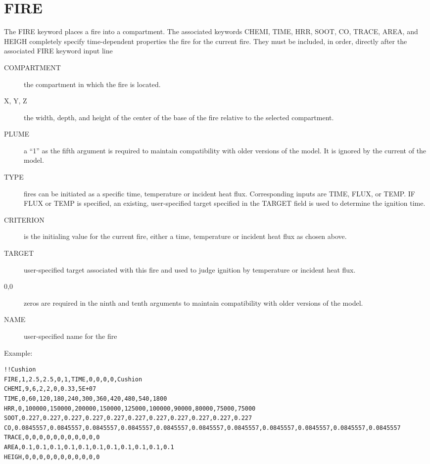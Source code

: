 \section{FIRE}

The FIRE keyword places a fire into a compartment. The associated keywords CHEMI, TIME, HRR, SOOT, CO, TRACE, AREA, and HEIGH completely specify time-dependent properties the fire for the current fire. They must be included, in order, directly after the associated FIRE keyword input line

\begin{adjustwidth}{1cm}{0cm}
\begin{description}
  \item[COMPARTMENT] the compartment in which the fire is located.
  \item[X, Y, Z] the width, depth, and height of the center of the base of the fire relative to the selected compartment.
  \item [PLUME] a ``1'' as the fifth argument is required to maintain compatibility with older versions of the model. It is ignored by the current of the model.
  \item[TYPE] fires can be initiated as a specific time, temperature or incident heat flux. Corresponding inputs are TIME, FLUX, or TEMP.  IF FLUX or TEMP is specified, an existing, user-specified target specified in the TARGET field is used to determine the ignition time.
  \item[CRITERION] is the initialing value for the current fire, either a time, temperature or incident heat flux as chosen above.
  \item[TARGET] user-specified target associated with this fire and used to judge ignition by temperature or incident heat flux.
  \item[0,0] zeros are required in the ninth and tenth arguments to maintain compatibility with older versions of the model.
  \item[NAME] user-specified name for the fire
\end{description}
\end{adjustwidth}

\noindent Example:

\begin{lstlisting}
!!Cushion
FIRE,1,2.5,2.5,0,1,TIME,0,0,0,0,Cushion
CHEMI,9,6,2,2,0,0.33,5E+07
TIME,0,60,120,180,240,300,360,420,480,540,1800
HRR,0,100000,150000,200000,150000,125000,100000,90000,80000,75000,75000
SOOT,0.227,0.227,0.227,0.227,0.227,0.227,0.227,0.227,0.227,0.227,0.227
CO,0.0845557,0.0845557,0.0845557,0.0845557,0.0845557,0.0845557,0.0845557,0.0845557,0.0845557,0.0845557,0.0845557
TRACE,0,0,0,0,0,0,0,0,0,0,0
AREA,0.1,0.1,0.1,0.1,0.1,0.1,0.1,0.1,0.1,0.1,0.1
HEIGH,0,0,0,0,0,0,0,0,0,0,0
\end{lstlisting}

